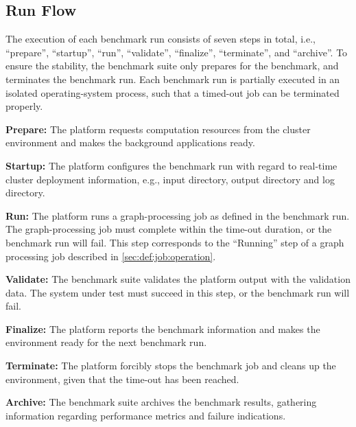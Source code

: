 \subsection{Run Flow}
\label{sec:process:execution:run_flow}
The execution of each benchmark run consists of seven steps in total, i.e., ``prepare'', ``startup'', ``run'', ``validate'', ``finalize'', ``terminate'', and  ``archive''. To ensure the stability, the benchmark suite only prepares for the benchmark, and terminates the benchmark run. Each benchmark run is partially executed in an isolated operating-system process, such that a timed-out job can be terminated properly.

\begin{enumerate}[label=\textbf{[\arabic*]}]
    \item \textbf{Prepare:} The platform requests computation resources from the cluster environment and makes the background applications ready.
    
    \item \textbf{Startup:} The platform configures the benchmark run with regard to real-time cluster deployment information, e.g., input directory, output directory and log directory.
    
    \item \textbf{Run:} The platform runs a graph-processing job as defined in the benchmark run. The graph-processing job must complete within the time-out duration, or the benchmark run will fail. This step corresponds to the ``Running'' step of a graph processing job described in \autoref{sec:def:job:operation}.
    
    \item \textbf{Validate:} The benchmark suite validates the platform output with the validation data. The system under test must succeed in this step, or the benchmark run will fail.
    
    \item \textbf{Finalize:} The platform reports the benchmark information and makes the environment ready for the next benchmark run.
    
    \item \textbf{Terminate:} The platform forcibly stops the benchmark job and cleans up the environment, given that the time-out has been reached. 
    
    \item \textbf{Archive:} The benchmark suite archives the benchmark results, gathering information regarding performance metrics and failure indications.
\end{enumerate}


